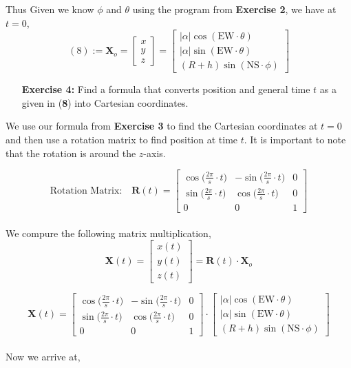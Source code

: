 \documentclass[11pt]{article}
\theoremstyle{definition}
\newcommand{\1}[1]{\mathbf{1} \left \{ #1 \right \}}
\begin{document}
Thus Given we know $\phi$ and $\theta$ using the program from \textbf{Exercise 2}, we have at $t=0$,
\[(8):= \textbf{X}_o = \begin{bmatrix} x \\ y \\ z \end{bmatrix} = \begin{bmatrix}
|\alpha| \cos (\textrm{EW} \cdot \theta) \\ |\alpha| \sin (\textrm{EW} \cdot \theta) \\ (R + h) \sin (\textrm{NS} \cdot \phi) \end{bmatrix}\]

\begin{itemize}
\item[{\textbf{Exercise 4:}}] Find a formula that converts position and general time $t$ as a given in (\textbf{8}) into Cartesian coordinates.
\end{itemize}
We use our formula from \textbf{Exercise 3} to find the Cartesian coordinates at $t=0$ and then use a rotation matrix to find position at time $t$.  It is important to note that the rotation is around the $z$-axis.

\[\textrm{Rotation Matrix:} \quad \textbf{R}(t) = \begin{bmatrix}
\cos \big(\frac{2\pi}{s} \cdot t\big) & -\sin \big(\frac{2\pi}{s} \cdot t\big) & 0 \\ \sin \big(\frac{2\pi}{s} \cdot t\big) & \cos \big(\frac{2\pi}{s} \cdot t\big) & 0 \\ 0 & 0 & 1 \end{bmatrix}\] \\
We compure the following matrix multiplication,
\[\textbf{X}(t) = \begin{bmatrix} x(t) \\ y(t) \\ z(t) \end{bmatrix} = \textbf{R}(t) \cdot \textbf{X}_o\]

\[\textbf{X}(t) = \begin{bmatrix}
\cos \big(\frac{2\pi}{s} \cdot t\big) & -\sin \big(\frac{2\pi}{s} \cdot t\big) & 0 \\ \sin \big(\frac{2\pi}{s} \cdot t\big) & \cos \big(\frac{2\pi}{s} \cdot t\big) & 0 \\ 0 & 0 & 1 \end{bmatrix} \cdot
\begin{bmatrix}
|\alpha| \cos (\textrm{EW} \cdot \theta) \\
|\alpha| \sin (\textrm{EW} \cdot \theta) \\
(R + h) \sin (\textrm{NS} \cdot \phi)
\end{bmatrix} \] \\
Now we arrive at,
\end{document}
